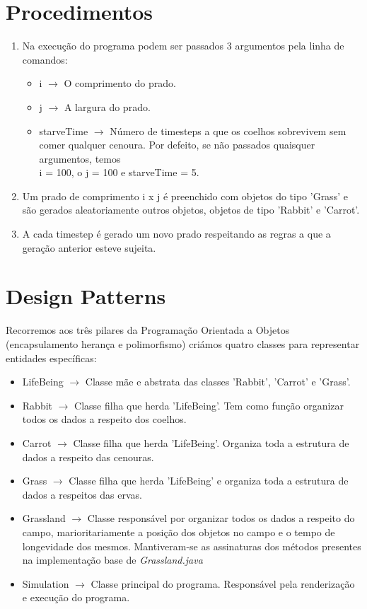 \documentclass {report}
\begin{document}
\section{Procedimentos}
\begin{enumerate}
  \item Na execução do programa podem ser passados 3 argumentos pela linha de comandos:
		\begin{itemize}
			\item i \(\rightarrow\) O comprimento do prado.
			\item j \(\rightarrow\) A largura do prado. 
			\item starveTime \(\rightarrow\) Número de timesteps a que os coelhos 
					  sobrevivem sem comer qualquer cenoura. Por defeito, se não passados 
						quaisquer argumentos, temos \\i = 100, o j = 100 e starveTime = 5.
		\end{itemize}
	\item Um prado de comprimento i x j é preenchido com objetos do tipo 'Grass'
				e são gerados aleatoriamente outros objetos, objetos de tipo 'Rabbit' e 
				'Carrot'.
	\item A cada timestep é gerado um novo prado respeitando as regras a que
				a geração anterior esteve sujeita.
\end{enumerate}

\section{Design Patterns}
	Recorremos aos três pilares da Programação Orientada a Objetos (encapsulamento 
	herança e polimorfismo) criámos quatro classes para representar entidades
	específicas:
	\begin{itemize}
		\item	LifeBeing \(\rightarrow\) Classe mãe e abstrata das classes 'Rabbit',
					'Carrot' e 'Grass'.
		\item	Rabbit \(\rightarrow\) Classe filha que herda 'LifeBeing'. Tem como função 
					organizar todos os dados a respeito dos coelhos.
		\item	Carrot \(\rightarrow\) Classe filha que herda 'LifeBeing'. Organiza 
					toda a estrutura de dados a respeito das cenouras.
		\item	Grass \(\rightarrow\) Classe filha que herda 'LifeBeing' e organiza 
					toda a estrutura de dados a respeitos das ervas.
		\item Grassland \(\rightarrow\) Classe responsável por organizar todos os
					dados a respeito do campo, marioritariamente a posição dos objetos
					no campo e o tempo de longevidade dos mesmos. Mantiveram-se as 
					assinaturas dos métodos presentes na implementação base 
					de \textit{Grassland.java}
		\item Simulation \(\rightarrow\) Classe principal do programa. Responsável
					pela renderização e execução do programa.
	\end{itemize}
\end{document}
